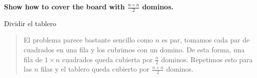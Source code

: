 \textbf{Show how to cover the board with $\frac{n \times n}{2}$ dominos.}\vspace{.2cm}

\textcolor{bibi}{Dividir el tablero}
\begin{quote}
    El problema parece bastante sencillo como $n$ es par, tomamos cada par de cuadrados en una fila y los cubrimos con un domino. De esta forma, una fila de $1 \times n$ cuadrados queda cubierta por $\frac{n}{2}$ dominos. Repetimos esto para las $n$ filas y el tablero queda cubierto por $\frac{n \times n}{2}$ dominos. \vspace{.2cm}
\end{quote} 